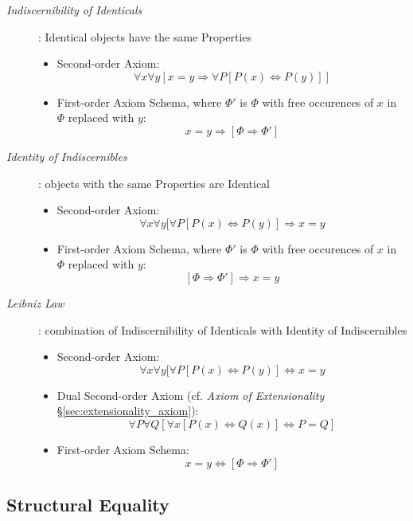 \begin{description}

\item[\emph{Indiscernibility of Identicals}]: Identical objects have
the same Properties
\begin{itemize}
    \item Second-order Axiom:
    \[
        \forall x \forall y
        [ x = y \Rightarrow \forall P [ P(x) \Leftrightarrow P(y) ]]
    \]
    \item First-order Axiom Schema, where $\Phi'$ is $\Phi$ with free
      occurences of $x$ in $\Phi$ replaced with $y$:
    \[
        x = y \Rightarrow [\Phi \Rightarrow \Phi']
    \]
\end{itemize}

\item[\emph{Identity of Indiscernibles}]: objects with the same Properties
are Identical
\begin{itemize}
    \item Second-order Axiom:
    \[
        \forall x \forall y
        [ \forall P [ P(x) \Leftrightarrow P(y) ] \Rightarrow x = y
    \]
    \item First-order Axiom Schema, where $\Phi'$ is $\Phi$ with free
      occurences of $x$ in $\Phi$ replaced with $y$:
    \[
        [\Phi \Rightarrow \Phi'] \Rightarrow x = y
    \]
\end{itemize}

\item[\emph{Leibniz Law}]: combination of Indiscernibility of
  Identicals with Identity of Indiscernibles
\begin{itemize}
    \item Second-order Axiom:
    \[
        \forall x \forall y
        [ \forall P [ P(x) \Leftrightarrow P(y) ] \Leftrightarrow x = y
    \]
    \item Dual Second-order Axiom (cf. \emph{Axiom of Extensionality}
      \S\ref{sec:extensionality_axiom}):
    \[
        \forall P \forall Q
        [ \forall x [P(x) \Leftrightarrow Q(x)] \Leftrightarrow P = Q ]
    \]
    \item First-order Axiom Schema:
    \[
        x = y \Leftrightarrow [\Phi \Rightarrow \Phi']
    \]
\end{itemize}


\end{description}



\subsection{Structural Equality}\label{sec:structural_equality}

